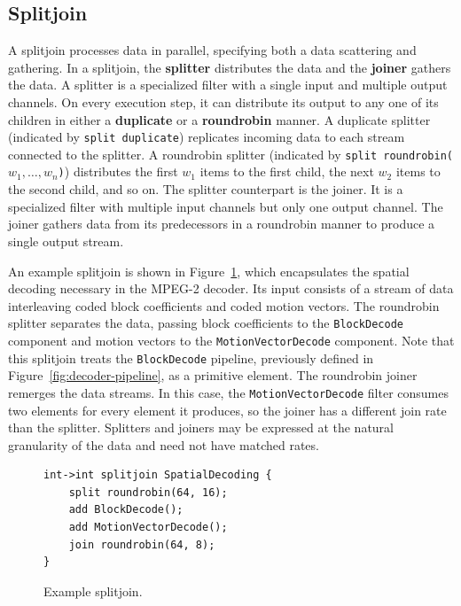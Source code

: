 \subsection{Splitjoin}
A splitjoin processes data in parallel, specifying both a data
scattering and gathering. In a
splitjoin, the \textbf{splitter} distributes the data and the
\textbf{joiner} gathers the data. A splitter is a specialized
filter with a single input and multiple output channels. On every
execution step, it can distribute its output to any one of its
children in either a \textbf{duplicate} or a \textbf{roundrobin} manner.  A
duplicate splitter (indicated by \texttt{split duplicate}) replicates
incoming data to each stream connected to the splitter.  A
roundrobin splitter (indicated by {\tt split
roundrobin($w_1,\ldots,w_n$)}) distributes the first $w_1$ items to
the first child, the next $w_2$ items to the second child, and so
on.  The splitter counterpart is the joiner. It is a specialized
 filter with multiple input channels but only one output channel. 
The joiner gathers data from its predecessors in a roundrobin manner to
produce a single output stream.

An example splitjoin is shown in Figure~\ref{fig:spatialdecode}, which
encapsulates the spatial decoding necessary in the MPEG-2 decoder. Its input
consists of a stream of data interleaving coded block coefficients and 
coded motion vectors. The roundrobin splitter separates the data,
passing block coefficients to the \texttt{BlockDecode} component and 
motion vectors to the \texttt{MotionVectorDecode} component. Note that this splitjoin
treats the \texttt{BlockDecode} pipeline, previously defined in Figure~\ref{fig:decoder-pipeline},
as a primitive element. The roundrobin joiner remerges the data streams. In this case,
the \texttt{MotionVectorDecode} filter consumes two elements for every element it produces,
so the joiner has a different join rate than the splitter. Splitters and joiners
may be expressed at the natural granularity of the data and need not have matched rates.

\begin{figure}
  \begin{center}
    \begin{minipage}{3in}
      \begin{small}
        \begin{verbatim}
int->int splitjoin SpatialDecoding {
    split roundrobin(64, 16);
    add BlockDecode();
    add MotionVectorDecode();
    join roundrobin(64, 8);
}
        \end{verbatim}
      \end{small}
    \end{minipage}
  \end{center}
  \caption{Example splitjoin.}
  \label{fig:spatialdecode}
\end{figure}


